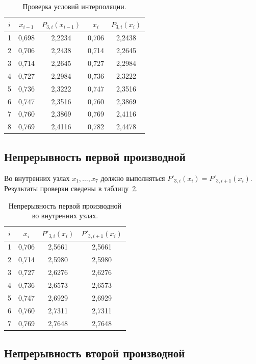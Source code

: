\documentclass[a4paper, final]{article}
\begin{document}
\begin{table}[h!]
\centering
\small
\begin{tabular}{|c|c|c|c|c|}
\hline
$i$ & $x_{i-1}$ & $P_{3,i}(x_{i-1})$ & $x_i$ & $P_{3,i}(x_i)$ \\
\hline
1 & 0,698 & 2,2234 & 0,706 & 2,2438 \\
2 & 0,706 & 2,2438 & 0,714 & 2,2645 \\
3 & 0,714 & 2,2645 & 0,727 & 2,2984 \\
4 & 0,727 & 2,2984 & 0,736 & 2,3222 \\
5 & 0,736 & 2,3222 & 0,747 & 2,3516 \\
6 & 0,747 & 2,3516 & 0,760 & 2,3869 \\
7 & 0,760 & 2,3869 & 0,769 & 2,4116 \\
8 & 0,769 & 2,4116 & 0,782 & 2,4478 \\
\hline
\end{tabular}
\caption{Проверка условий интерполяции.}
\label{tab:check_interp}
\end{table}

\subsection{Непрерывность первой производной}

Во внутренних узлах $x_1, \ldots, x_7$ должно выполняться
$P'_{3,i}(x_i) = P'_{3,i+1}(x_i)$. Результаты проверки сведены в
таблицу~\ref{tab:check_der1}.

\begin{table}[h!]
\centering
\small
\begin{tabular}{|c|c|c|c|}
\hline
$i$ & $x_i$ & $P'_{3,i}(x_i)$ & $P'_{3,i+1}(x_i)$ \\
\hline
1 & 0,706 & 2,5661 & 2,5661 \\
2 & 0,714 & 2,5980 & 2,5980 \\
3 & 0,727 & 2,6276 & 2,6276 \\
4 & 0,736 & 2,6573 & 2,6573 \\
5 & 0,747 & 2,6929 & 2,6929 \\
6 & 0,760 & 2,7311 & 2,7311 \\
7 & 0,769 & 2,7648 & 2,7648 \\
\hline
\end{tabular}
\caption{Непрерывность первой производной во внутренних узлах.}
\label{tab:check_der1}
\end{table}

\subsection{Непрерывность второй производной}
\end{document}
